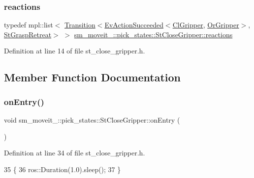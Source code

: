 \subsubsection{\texorpdfstring{reactions}{reactions}}
{\footnotesize\ttfamily typedef mpl\+::list$<$ \hyperlink{classsmacc_1_1Transition}{Transition}$<$\hyperlink{structsmacc_1_1default__events_1_1EvActionSucceeded}{Ev\+Action\+Succeeded}$<$\hyperlink{classsm__moveit__4_1_1cl__gripper_1_1ClGripper}{Cl\+Gripper}, \hyperlink{classsm__moveit__4_1_1OrGripper}{Or\+Gripper}$>$, \hyperlink{structsm__moveit__4_1_1pick__states_1_1StGraspRetreat}{St\+Grasp\+Retreat}$>$ $>$ \hyperlink{structsm__moveit__4_1_1pick__states_1_1StCloseGripper_a6934886ed914236301c2341e96264729}{sm\+\_\+moveit\+\_\+::pick\+\_\+states\+::\+St\+Close\+Gripper\+::reactions}}



Definition at line 14 of file st\+\_\+close\+\_\+gripper.\+h.



\subsection{Member Function Documentation}
\mbox{\label{structsm__moveit__4_1_1pick__states_1_1StCloseGripper_a8d208da87aa5bc3758b3769fe56b5c42}} 
\subsubsection{\texorpdfstring{on\+Entry()}{onEntry()}}
{\footnotesize\ttfamily void sm\+\_\+moveit\+\_\+::pick\+\_\+states\+::\+St\+Close\+Gripper\+::on\+Entry (\begin{DoxyParamCaption}{ }\end{DoxyParamCaption})\hspace{0.3cm}{\ttfamily [inline]}}



Definition at line 34 of file st\+\_\+close\+\_\+gripper.\+h.


\begin{DoxyCode}
35          \{
36             ros::Duration(1.0).sleep();
37          \}
\end{DoxyCode}
\mbox{\label{structsm__moveit__4_1_1pick__states_1_1StCloseGripper_a427f4aec6a2173899b55e6a45ca28773}} 
